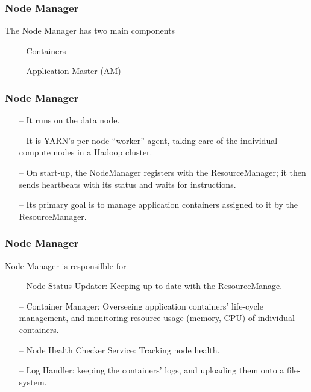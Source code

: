 \begin{frame}[c]{ }
	\frametitle{Node Manager }
		The Node Manager has two main components
		\begin{itemize}  [<+->]
			\item [--] Containers
			\item [--] Application Master (AM)
		\end{itemize}
\end{frame}
\begin{frame}[c]{ }
	\frametitle{Node Manager }
	{\footnotesize
		\begin{itemize}  [<+->]
			\item [--] It runs on the data node.
			\item [--] It is YARN’s per-node “worker” agent, taking care of the individual compute nodes in a Hadoop cluster.
			\item [--] On start-up, the NodeManager registers with the ResourceManager; it then sends heartbeats with its status and waits for instructions. 
			\item [--] Its primary goal is to manage application containers assigned to it by the ResourceManager.
		\end{itemize}
	}
\end{frame}
\begin{frame}[c]{ }
	\frametitle{Node Manager }
	Node Manager is responsilble for 
	{\footnotesize
		\begin{itemize}  [<+->]
			\item [--] Node Status Updater: Keeping up-to-date with the ResourceManage.
			\item [--] Container Manager: Overseeing application containers’ life-cycle management, and monitoring resource usage (memory, CPU) of individual containers.
			\item [--] Node Health Checker Service: Tracking node health.
			\item [--] Log Handler: keeping the containers’ logs, and uploading them onto a file-system.
		\end{itemize}
	}
\end{frame}
